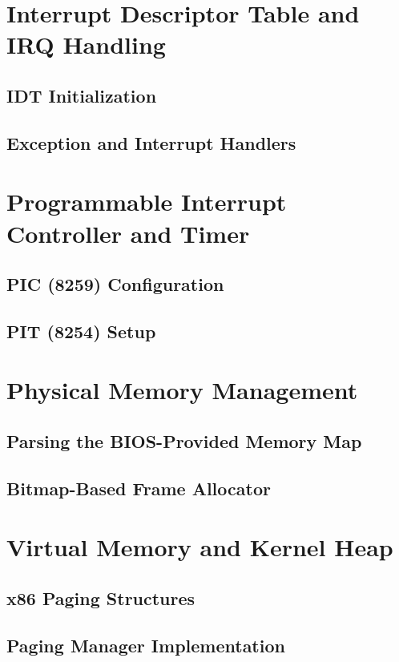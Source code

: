 \documentclass[12pt,a4paper]{report}
\begin{document}
	\chapter{Interrupt Descriptor Table and IRQ Handling}
	\section{IDT Initialization}
	
	\section{Exception and Interrupt Handlers}
	
	\chapter{Programmable Interrupt Controller and Timer}
	\section{PIC (8259) Configuration}
	
	\section{PIT (8254) Setup}
	
	\chapter{Physical Memory Management}
	\section{Parsing the BIOS-Provided Memory Map}
	
	\section{Bitmap-Based Frame Allocator}
	
	\chapter{Virtual Memory and Kernel Heap}
	\section{x86 Paging Structures}
	
	\section{Paging Manager Implementation}
	
\end{document}
